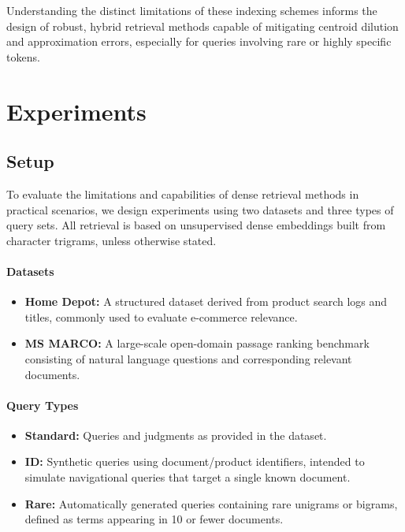 \documentclass[manuscript]{acmart}
\begin{document}
Understanding the distinct limitations of these indexing schemes informs the design of robust, hybrid retrieval methods capable of mitigating centroid dilution and approximation errors, especially for queries involving rare or highly specific tokens.


\section{Experiments}\label{sec:experiments}

\subsection{Setup}

To evaluate the limitations and capabilities of dense retrieval methods in practical scenarios, we design experiments using two datasets and three types of query sets. All retrieval is based on unsupervised dense embeddings built from character trigrams, unless otherwise stated.

\paragraph{Datasets}
\begin{itemize}
    \item \textbf{Home Depot:} A structured dataset derived from product search logs and titles, commonly used to evaluate e-commerce relevance.
    \item \textbf{MS MARCO:} A large-scale open-domain passage ranking benchmark consisting of natural language questions and corresponding relevant documents.
\end{itemize}

\paragraph{Query Types}
\begin{itemize}
    \item \textbf{Standard:} Queries and judgments as provided in the dataset.
    \item \textbf{ID:} Synthetic queries using document/product identifiers, intended to simulate navigational queries that target a single known document.
    \item \textbf{Rare:} Automatically generated queries containing rare unigrams or bigrams, defined as terms appearing in 10 or fewer documents.
\end{itemize}
\end{document}
